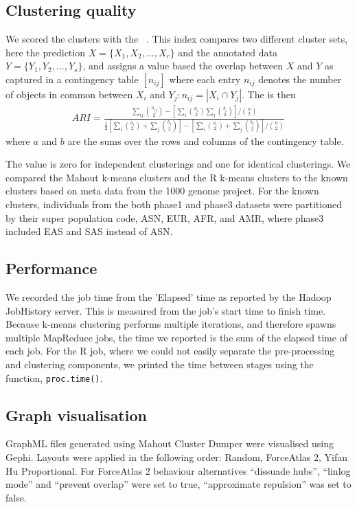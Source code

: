 \documentclass{bioinfo}
\begin{document}
\begin{methods}
\subsection*{Clustering quality}
We scored the clusters with the \ARI{}~\cite{Hubert1985}. 
This index compares two different cluster sets, here the prediction $X = \{ X_1, X_2, \ldots , X_r \}$ and the annotated data $Y = \{ Y_1, Y_2, \ldots , Y_s \}$, and assigns a value based the overlap between $X$ and $Y$ as captured in a contingency table $\left[n_{ij}\right]$ where each entry $n_{ij}$ denotes the number of objects in common between $X_i$ and $Y_j : n_{ij}=|X_i \cap Y_j|$. 
The \ARI{} is then 
{\tiny
\begin{eqnarray*}
ARI=\frac{\sum_{ij}{{n_{ij}\choose 2}} - \left[ \sum_{i}{{a_i\choose2}} \sum_{j}{{b_i\choose2}} \right] / {n\choose2}}{\frac{1}{2} \left[ \sum_{i}{{a_{i}\choose 2} + \sum_{j}{{b_{j}\choose 2}}} \right] - \left[ \sum_{i}{{a_{i}\choose 2} + \sum_{j}{{b_{j}\choose 2}}} \right] / {n\choose2}} 
\end{eqnarray*}
}
where $a$ and $b$ are the sums over the rows and columns of the contingency table.

The value is zero for independent clusterings and one for identical clusterings. 
We compared the Mahout k-means clusters and the R k-means clusters to the known clusters based on meta data from the 1000 genome project.
For the known clusters, individuals from the both phase1 and phase3 datasets were partitioned by their super population code, ASN, EUR, AFR, and AMR, where phase3 included EAS and SAS instead of ASN.



\subsection*{Performance}
We recorded the job time from the 'Elapsed' time as reported by the Hadoop JobHistory server. This is measured from the job's start time to finish time.
Because k-means clustering performs multiple iterations, and therefore spawns multiple MapReduce jobs, the time we reported is the sum of the elapsed time of each job.
For the R job, where we could not easily separate the pre-processing and clustering components, we printed the time between
stages using the function, \texttt{proc.time()}.


\subsection*{Graph visualisation}
GraphML files generated using Mahout Cluster Dumper were visualised using Gephi. Layouts were applied in the following order: Random, ForceAtlas 2, Yifan Hu Proportional. For ForceAtlas 2 behaviour alternatives ``dissuade hubs'', ``linlog mode'' and ``prevent overlap'' were set to true, ``approximate repulsion'' was set to false.


\end{methods}
\end{document}
